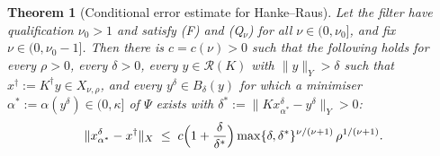 \documentclass[a4paper]{report}
\theoremstyle{plain}
\newtheorem{theorem}{Theorem}[chapter]
\theoremstyle{definition}
\theoremstyle{remark}
\newcommand{\Ran}{\mathcal{R}}
\newcommand{\dg}{^{\dagger}}
\begin{document}
\begin{theorem}[Conditional error estimate for Hanke--Raus]
  \label{thm_hanke_raus_conditional}
  Let the filter have qualification $\nu_0 > 1$ and satisfy (F) and (Q$_{\nu}$) for all
  $\nu \in (0,\nu_0]$, and fix $\nu \in (0,\nu_0-1]$.  Then there is $c = c(\nu) > 0$ such
  that the following holds for every $\rho > 0$, every $\delta > 0$, every
  $y \in \Ran(K)$ with $\|y\|_Y > \delta$ such that $x\dg := K\dg y \in X_{\nu,\rho}$, and
  every $y^{\delta} \in B_{\delta}(y)$ for which a minimiser
  $\alpha^{*} := \alpha(y^{\delta}) \in (0,\kappa]$ of $\Psi$ exists with
  $\delta^{*} := \|Kx^{\delta}_{\alpha^{*}} - y^{\delta}\|_Y > 0$:
  \[
    \|x^{\delta}_{\alpha^{*}} - x\dg\|_X \;\le\;
      c\Bigl(1 + \frac{\delta}{\delta^{*}}\Bigr)
      \max\{\delta,\delta^{*}\}^{\nu/(\nu+1)}\,\rho^{1/(\nu+1)} .
  \]
\end{theorem}
\end{document}
